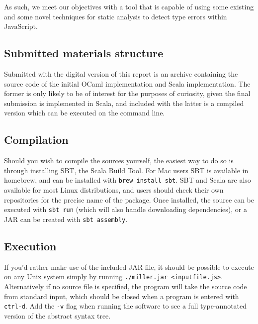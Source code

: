 \documentclass[british, twoside, openright]{bhamthesis}
\theoremstyle{definition}
\begin{document}
  As such, we meet our objectives with a tool that is capable of using some existing and some novel techniques for static analysis to detect type errors within JavaScript.

\printbibliography

\begin{appendices}
\chapter{Submitted materials structure}
Submitted with the digital version of this report is an archive containing the source code of the initial OCaml implementation and Scala implementation. The former is only likely to be of interest for the purposes of curiosity, given the final submission is implemented in Scala, and included with the latter is a compiled version which can be executed on the command line.

\section{Compilation}
Should you wish to compile the sources yourself, the easiest way to do so is through installing SBT, the Scala Build Tool. For Mac users SBT is available in homebrew, and can be installed with \texttt{brew install sbt}. SBT and Scala are also available for most Linux distributions, and users should check their own repositories for the precise name of the package. Once installed, the source can be executed with \texttt{sbt run} (which will also handle downloading dependencies), or a JAR can be created with \texttt{sbt assembly}.

\section{Execution}
If you'd rather make use of the included JAR file, it should be possible to execute on any Unix system simply by running \texttt{./miller.jar <inputfile.js>}. Alternatively if no source file is specified, the program will take the source code from standard input, which should be closed when a program is entered with \texttt{ctrl-d}. Add the \texttt{-v} flag when running the software to see a full type-annotated version of the abstract syntax tree.
\end{appendices}
\end{document}
